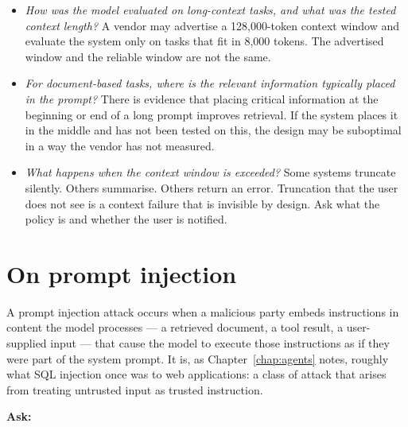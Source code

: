 \begin{itemize}
  \item \emph{How was the model evaluated on long-context
        tasks, and what was the tested context length?}
        A vendor may advertise a 128,000-token context
        window and evaluate the system only on tasks that
        fit in 8,000 tokens. The advertised window and the
        reliable window are not the same.

  \item \emph{For document-based tasks, where is the
        relevant information typically placed in the
        prompt?} There is evidence that placing critical
        information at the beginning or end of a long
        prompt improves retrieval. If the system places
        it in the middle and has not been tested on this,
        the design may be suboptimal in a way the
        vendor has not measured.

  \item \emph{What happens when the context window is
        exceeded?} Some systems truncate silently.
        Others summarise. Others return an error. Truncation
        that the user does not see is a context failure
        that is invisible by design. Ask what the policy is
        and whether the user is notified.
\end{itemize}

\section{On prompt injection}

A prompt injection attack occurs when a malicious party
embeds instructions in content the model processes ---
a retrieved document, a tool result, a user-supplied input
--- that cause the model to execute those instructions as
if they were part of the system prompt. It is, as
Chapter~\ref{chap:agents} notes, roughly what SQL injection once was to
web applications: a class of attack that arises from
treating untrusted input as trusted instruction.

\medskip
\noindent\textbf{Ask:}

